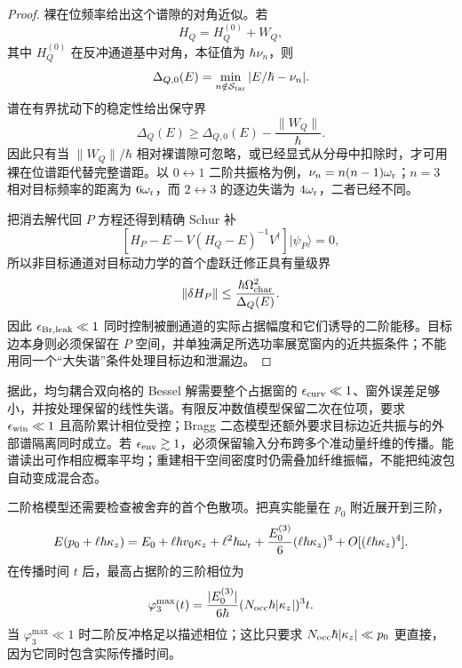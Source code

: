 \begin{proof}
裸在位频率给出这个谱隙的对角近似。若
\begin{equation*}
H_Q=H_Q^{(0)}+W_Q,
\end{equation*}
其中 $H_Q^{(0)}$ 在反冲通道基中对角，本征值为 $\hbar\nu_n$，则
\begin{equation*}
\Delta_{Q,0}(E)
=\min_{n\notin\mathcal S_{\rm tar}}|E/\hbar-\nu_n|.
\end{equation*}
谱在有界扰动下的稳定性给出保守界
\begin{equation*}
\Delta_Q(E)
\ge
\Delta_{Q,0}(E)-\frac{\|W_Q\|}{\hbar}.
\end{equation*}
因此只有当 $\|W_Q\|/\hbar$ 相对裸谱隙可忽略，或已经显式从分母中扣除时，才可用裸在位谱距代替完整谱距。以 $0\leftrightarrow1$ 二阶共振格为例，$\nu_n=n(n-1)\omega_{\rm r}$；$n=3$ 相对目标频率的距离为 $6\omega_{\rm r}$，而 $2\leftrightarrow3$ 的逐边失谐为 $4\omega_{\rm r}$，二者已经不同。

把消去解代回 $P$ 方程还得到精确 Schur 补
\begin{equation*}
\left[H_P-E-V(H_Q-E)^{-1}V^\dagger\right]|\psi_P\rangle=0,
\end{equation*}
所以非目标通道对目标动力学的首个虚跃迁修正具有量级界
\begin{equation*}
\|\delta H_P\|
\le
\frac{\hbar\Omega_{\rm char}^2}{\Delta_Q(E)}.
\end{equation*}
因此 $\epsilon_{\rm Br,leak}\ll1$ 同时控制被删通道的实际占据幅度和它们诱导的二阶能移。目标边本身则必须保留在 $P$ 空间，并单独满足所选功率展宽窗内的近共振条件；不能用同一个“大失谐”条件处理目标边和泄漏边。
\end{proof}


据此，均匀耦合双向格的 Bessel 解需要整个占据窗的 $\epsilon_{\rm curv}\ll1$、窗外误差足够小，并按处理保留的线性失谐。有限反冲数值模型保留二次在位项，要求 $\epsilon_{\rm win}\ll1$ 且高阶累计相位受控；Bragg 二态模型还额外要求目标边近共振与的外部谱隔离同时成立。若 $\epsilon_{\rm env}\gtrsim1$，必须保留输入分布跨多个准动量纤维的传播。能谱读出可作相应概率平均；重建相干空间密度时仍需叠加纤维振幅，不能把纯波包自动变成混合态。

二阶格模型还需要检查被舍弃的首个色散项。把真实能量在 $p_0$ 附近展开到三阶，
\begin{equation}
{
 E(p_0+\ell\hbar\kappa_z)
 =E_0+\ell\hbar v_0\kappa_z+\ell^2\hbar\omega_{\rm r}
 +\frac{E_0^{(3)}}{6}(\ell\hbar\kappa_z)^3+O[(\ell\hbar\kappa_z)^4].}
\label{eq:recoil_cubic_taylor_dp68}
\end{equation}
在传播时间 $t$ 后，最高占据阶的三阶相位为
\begin{equation}
{
 \varphi_3^{\max}(t)
 =\frac{|E_0^{(3)}|}{6\hbar}
 (N_{\rm occ}\hbar|\kappa_z|)^3t .}
\label{eq:cubic_phase_error_dp47}
\end{equation}
当 $\varphi_3^{\max}\ll1$ 时二阶反冲格足以描述相位；这比只要求 $N_{\rm occ}\hbar|\kappa_z|\ll p_0$ 更直接，因为它同时包含实际传播时间。


